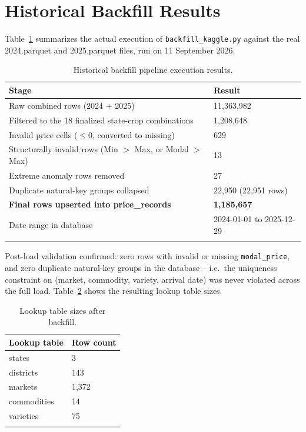 \section{Historical Backfill Results}
Table~\ref{tab:backfillresults} summarizes the actual execution of
\texttt{backfill\_kaggle.py} against the real 2024.parquet and
2025.parquet files, run on 11 September 2026.

\begin{longtable}{@{}p{8.5cm}p{4.5cm}@{}}
\toprule
\textbf{Stage} & \textbf{Result} \\
\midrule
\endhead
Raw combined rows (2024 + 2025) & 11{,}363{,}982 \\
Filtered to the 18 finalized state-crop combinations & 1{,}208{,}648 \\
Invalid price cells ($\leq 0$, converted to missing) & 629 \\
Structurally invalid rows (Min $>$ Max, or Modal $>$ Max) & 13 \\
Extreme anomaly rows removed & 27 \\
Duplicate natural-key groups collapsed & 22{,}950 (22{,}951 rows) \\
\textbf{Final rows upserted into price\_records} & \textbf{1{,}185{,}657} \\
Date range in database & 2024-01-01 to 2025-12-29 \\
\bottomrule
\caption{Historical backfill pipeline execution results.}
\label{tab:backfillresults}
\end{longtable}

Post-load validation confirmed: zero rows with invalid or missing
\texttt{modal\_price}, and zero duplicate natural-key groups in the
database -- i.e.\ the uniqueness constraint on (market, commodity,
variety, arrival date) was never violated across the full load.
Table~\ref{tab:lookupcounts} shows the resulting lookup table sizes.

\begin{longtable}{@{}p{5cm}p{3cm}@{}}
\toprule
\textbf{Lookup table} & \textbf{Row count} \\
\midrule
\endhead
states & 3 \\
districts & 143 \\
markets & 1{,}372 \\
commodities & 14 \\
varieties & 75 \\
\bottomrule
\caption{Lookup table sizes after backfill.}
\label{tab:lookupcounts}
\end{longtable}

